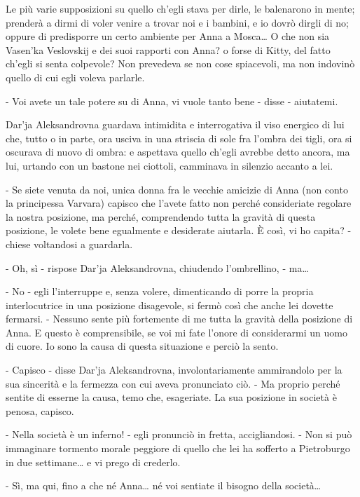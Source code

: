 Le più varie supposizioni su quello ch'egli stava per dirle, le balenarono in mente; prenderà a dirmi di voler venire a trovar noi e i bambini, e io dovrò dirgli di no; oppure di predisporre un certo ambiente per Anna a Mosca\ldots{} O che non sia Vasen'ka Veslovskij e dei suoi rapporti con Anna? o forse di Kitty, del fatto ch'egli si senta colpevole? Non prevedeva se non cose spiacevoli, ma non indovinò quello di cui egli voleva parlarle. 

- Voi avete un tale potere su di Anna, vi vuole tanto bene - disse - aiutatemi. 

Dar'ja Aleksandrovna guardava intimidita e interrogativa il viso energico di lui che, tutto o in parte, ora usciva in una striscia di sole fra l'ombra dei tigli, ora si oscurava di nuovo di ombra: e aspettava quello ch'egli avrebbe detto ancora, ma lui, urtando con un bastone nei ciottoli, camminava in silenzio accanto a lei. 

- Se siete venuta da noi, unica donna fra le vecchie amicizie di Anna (non conto la principessa Varvara) capisco che l'avete fatto non perché consideriate regolare la nostra posizione, ma perché, comprendendo tutta la gravità di questa posizione, le volete bene egualmente e desiderate aiutarla. È così, vi ho capita? - chiese voltandosi a guardarla. 

- Oh, sì - rispose Dar'ja Aleksandrovna, chiudendo l'ombrellino, - ma\ldots{} 

- No - egli l'interruppe e, senza volere, dimenticando di porre la propria interlocutrice in una posizione disagevole, si fermò così che anche lei dovette fermarsi. - Nessuno sente più fortemente di me tutta la gravità della posizione di Anna. E questo è comprensibile, se voi mi fate l'onore di considerarmi un uomo di cuore. Io sono la causa di questa situazione e perciò la sento. 

- Capisco - disse Dar'ja Aleksandrovna, involontariamente ammirandolo per la sua sincerità e la fermezza con cui aveva pronunciato ciò. - Ma proprio perché sentite di esserne la causa, temo che, esageriate. La sua posizione in società è penosa, capisco. 

- Nella società è un inferno! - egli pronunciò in fretta, accigliandosi. - Non si può immaginare tormento morale peggiore di quello che lei ha sofferto a Pietroburgo in due settimane\ldots{} e vi prego di crederlo. 

- Sì, ma qui, fino a che né Anna\ldots{} né voi sentiate il bisogno della società\ldots{} 

